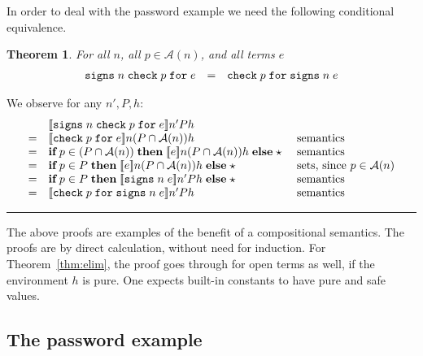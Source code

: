 \documentclass[submission,copyright,creativecommons]{eptcs}
\newcommand{\blackslug}{\rule{7pt}{7pt}}
\newcommand{\mifthenelse}[3]{\MIF\;#1\;\MTHEN\;#2\;\MELSE\;#3}
\newcommand{\chk}[2]{\CHK\;#1\;\FOR\;#2}
\newcommand{\signs}[2]{\SIGNS\;#1\;#2}
\newcommand{\FOR}{\mbox{\texttt{for}}}
\newcommand{\MTHEN}{{\textbf{then}}}
\newcommand{\MELSE}{{\textbf{else}}}
\newcommand{\MIF}{{\textbf{if}}}
\newcommand{\A}{\mathcal{A}}
\newcommand{\ldb}{[\![}
\newcommand{\rdb}{]\!]}
\newcommand{\means}[1]{\ldb {#1}\rdb}
\newcommand{\intersect}{\cap}
\newcommand{\CHK}{\mbox{\texttt{check}}}
\newcommand{\SIGNS}{\mbox{\texttt{signs}}}
\newcommand{\n}{n} \newcommand{\p}{p} \newcommand{\Ps}{\Pi} \newcommand{\h}{h}
\newtheorem{theorem}{Theorem}[section]
\newenvironment{proof}{\begin{trivlist}\item[\hskip\labelsep{\bf
Proof:}]}{\blackslug\end{trivlist}}
\begin{document}
In order to deal with the password example we need the following conditional equivalence.

\begin{theorem}
\label{thm:commute}
For all $\n$, all $\p\in\A(\n)$, and all terms $e$
\[
\begin{array}{lcl}
\signs{\n}{\chk{\p}{e}}
& = & \chk{\p}{\signs{\n}{e}}
\end{array}
\]  
\end{theorem}
\begin{proof}
We observe for any $\n',P, \h$:
\[\begin{array}{cll}
& \means{\signs{\n}{\chk{\p}{e}}}\n' P\h \\
=&\means{\chk{\p}{e}}\n(P\intersect \A(\n))\h & \mbox{ semantics}\\
=&\mifthenelse{\p\in(P\intersect\A(\n))}{\means{e}\n(P\intersect\A(\n))\h}{\star} &\mbox{ semantics}\\
=&\mifthenelse{\p\in P}{\means{e}\n(P\intersect\A(\n))\h}{\star} &\mbox{ sets, since $\p\in\A(\n)$}\\
=&\mifthenelse{\p\in P}{\means{\signs{\n}{e}}\n' P \h}{\star} &\mbox{ semantics}\\
=&\means{\chk{\p}{\signs{\n}{e}}}\n' P \h &\mbox{ semantics }\end{array} 
\]
\end{proof}
The above proofs are examples of the benefit of a compositional
semantics.  The proofs are by direct calculation, without need for
induction.  For Theorem~\ref{thm:elim}, the proof goes through for
open terms as well, if the environment $\h$ is pure.  One expects
built-in constants to have pure and safe values.

\subsection{The password example}
\end{document}

